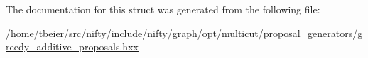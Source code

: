 The documentation for this struct was generated from the following file\+:\begin{DoxyCompactItemize}
\item 
/home/tbeier/src/nifty/include/nifty/graph/opt/multicut/proposal\+\_\+generators/\hyperlink{greedy__additive__proposals_8hxx}{greedy\+\_\+additive\+\_\+proposals.\+hxx}\end{DoxyCompactItemize}

